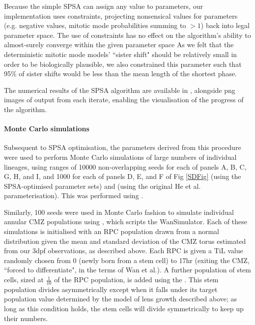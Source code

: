 \documentclass{ut-thesis}
\begin{document}
\begin{NoHyper}
 Because the simple SPSA can assign any value to parameters, our implementation uses constraints, projecting nonsensical values for parameters (e.g. negative values, mitotic mode probabilities summing to $>1$) back into legal parameter space. The use of constraints has no effect on the algorithm's ability to almost-surely converge within the given parameter space \cite{Sadegh1997} As we felt that the deterministic mitotic mode models' ``sister shift" should be relatively small in order to be biologically plausible, we also constrained this parameter such that 95\% of sister shifts would be less than the mean length of the shortest phase.

 The numerical results of the SPSA algorithm are available in , alongside png images of output from each iterate, enabling the visualisation of the progress of the algorithm.

\paragraph{Monte Carlo simulations}
 Subsequent to SPSA optimisation, the parameters derived from this procedure were used to perform Monte Carlo simulations of large numbers of individual lineages, using ranges of 10000 non-overlapping seeds for each of panels A, B, C, G, H, and I, and 1000 for each of panels D, E, and F of Fig \ref{SDFig} (using the SPSA-optimised parameter sets) and  (using the original He et al. parameterisation). This was performed using .

 Similarly, 100 seeds were used in Monte Carlo fashion to simulate individual annular CMZ populations using , which scripts the WanSimulator. Each of these simulations is initialised with an RPC population drawn from a normal distribution given the mean and standard deviation of the CMZ torus estimated from our 3dpf observations, as described above. Each RPC is given a TiL value randomly chosen from 0 (newly born from a stem cell) to 17hr (exiting the CMZ, ``forced to differentiate", in the terms of Wan et al.). A further population of stem cells, sized at $\frac{1}{10}$ of the RPC population, is added using the . This stem population divides asymmetrically except when it falls under its target population value determined by the model of lens growth described above; as long as this condition holds, the stem cells will divide symmetrically to keep up their numbers.


\end{NoHyper}
\end{document}
